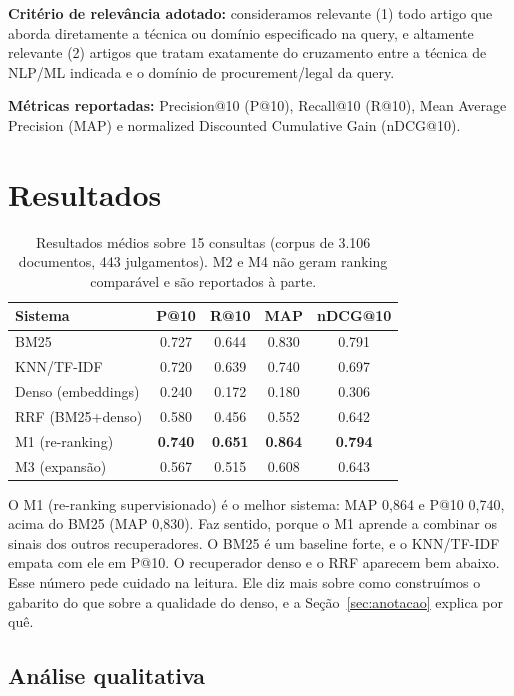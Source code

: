 \documentclass[12pt]{article}
\begin{document}
\textbf{Critério de relevância adotado:} consideramos relevante (1) todo artigo que aborda diretamente a técnica ou domínio especificado na query, e altamente relevante (2) artigos que tratam exatamente do cruzamento entre a técnica de NLP/ML indicada e o domínio de procurement/legal da query.

\textbf{Métricas reportadas:} Precision@10 (P@10), Recall@10 (R@10), Mean Average Precision (MAP) e normalized Discounted Cumulative Gain (nDCG@10).

\section{Resultados}
\label{sec:resultados}

\begin{table}[h]
\centering
\caption{Resultados médios sobre 15 consultas (corpus de 3.106 documentos, 443 julgamentos). M2 e M4 não geram ranking comparável e são reportados à parte.}
\label{tab:results}
\begin{tabular}{lcccc}
\toprule
\textbf{Sistema} & \textbf{P@10} & \textbf{R@10} & \textbf{MAP} & \textbf{nDCG@10} \\
\midrule
BM25                & 0.727 & 0.644 & 0.830 & 0.791 \\
KNN/TF-IDF          & 0.720 & 0.639 & 0.740 & 0.697 \\
Denso (embeddings)  & 0.240 & 0.172 & 0.180 & 0.306 \\
RRF (BM25+denso)    & 0.580 & 0.456 & 0.552 & 0.642 \\
M1 (re-ranking)     & \textbf{0.740} & \textbf{0.651} & \textbf{0.864} & \textbf{0.794} \\
M3 (expansão)       & 0.567 & 0.515 & 0.608 & 0.643 \\
\bottomrule
\end{tabular}
\end{table}

O M1 (re-ranking supervisionado) é o melhor sistema: MAP 0,864 e P@10 0,740, acima do BM25 (MAP 0,830). Faz sentido, porque o M1 aprende a combinar os sinais dos outros recuperadores. O BM25 é um baseline forte, e o KNN/TF-IDF empata com ele em P@10. O recuperador denso e o RRF aparecem bem abaixo. Esse número pede cuidado na leitura. Ele diz mais sobre como construímos o gabarito do que sobre a qualidade do denso, e a Seção~\ref{sec:anotacao} explica por quê.

\subsection{Análise qualitativa}
\end{document}
